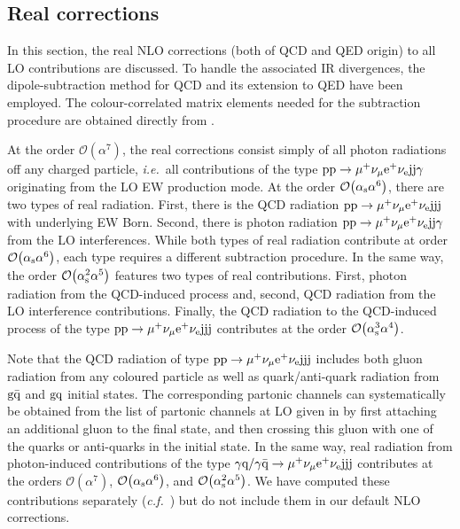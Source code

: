 \documentclass[a4article,11pt]{article}
\begin{document}
\subsection{Real corrections}
\label{sec:RealCorrections}

In this section, the real NLO corrections (both of QCD and QED origin) 
to all LO contributions are discussed.  
To handle the associated IR divergences,
the dipole-subtraction method for QCD \cite{Catani:1996vz} and its
extension to QED \cite{Dittmaier:1999mb} have been employed.  The
colour-correlated matrix elements needed for the subtraction procedure
are obtained directly from \recola.

At the order $\mathcal{O}{\left(\alpha^{7}\right)}$, the real
corrections consist simply of all photon radiations off any charged
particle, \emph{i.e.}\ all contributions of the type
$\text{p}\text{p}\to\mu^+\nu_\mu\text{e}^+\nu_{\text{e}}\text{j}\text{j}\gamma$ originating from the
LO EW production mode.
%
At the order $\mathcal{O}{\left(\alpha_\text{s}\alpha^{6}\right)}$,
there are two types of real radiation.  First, there is the QCD
radiation $\text{p}\text{p}\to\mu^+\nu_\mu\text{e}^+\nu_{\text{e}}\text{j}\text{j}\text{j}$ with
underlying EW Born.  Second, there is photon radiation
$\text{p}\text{p}\to\mu^+\nu_\mu\text{e}^+\nu_{\text{e}}\text{j}\text{j}\gamma$ from the LO
interferences.  While both types of real radiation contribute at order
$\mathcal{O}{\left(\alpha_\text{s}\alpha^{6}\right)}$, each type
requires a different subtraction procedure.
%
In the same way, the order $\mathcal{O}{\left(\alpha_\text{s}^{2}\alpha^{5}\right)}$ features two types of real contributions.
First, photon radiation from the QCD-induced process and, second, QCD
radiation from the LO interference contributions.
%
Finally, the QCD radiation to the QCD-induced process of the type
$\text{p}\text{p}\to\mu^+\nu_\mu\text{e}^+\nu_{\text{e}}\text{j}\text{j}\text{j}$ contributes at the
order $\mathcal{O}{\left(\alpha_\text{s}^{3}\alpha^{4}\right)}$.

Note that the QCD radiation of type
$\text{p}\text{p}\to\mu^+\nu_\mu\text{e}^+\nu_{\text{e}}\text{j}\text{j}\text{j}$ includes both gluon
radiation from any coloured particle as well as quark/anti-quark
radiation from $\text{g}\bar{\text{q}}$ and $\text{g}\text{q}$ initial states. The
corresponding partonic channels can systematically be obtained from
the list of partonic channels at LO given in
 by first attaching an additional gluon
to the final state, and then crossing this gluon with one of the
quarks or anti-quarks in the initial state.  In the same way, real
radiation from photon-induced contributions of the type $\gamma \text{q} /
\gamma \bar{\text{q}} \to\mu^+\nu_\mu\text{e}^+\nu_{\text{e}}\text{j}\text{j}\text{j}$ contributes at
the orders $\mathcal{O}{\left(\alpha^{7}\right)}$,
$\mathcal{O}{\left(\alpha_\text{s}\alpha^{6}\right)}$, and
$\mathcal{O}{\left(\alpha_\text{s}^{2}\alpha^{5}\right)}$.  We have
computed these contributions separately (\emph{c.f.}\ 
) but do not include them in our
default NLO corrections.
\end{document}
